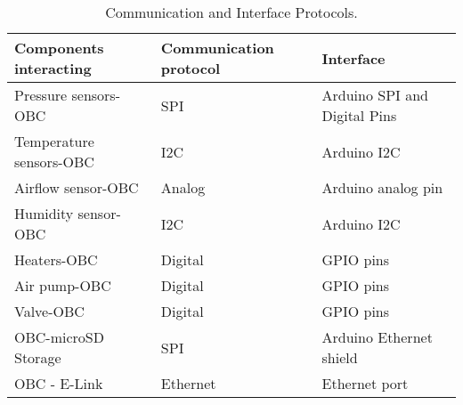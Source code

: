 \begin{table}[H]
\centering
\begin{tabular}{lll}
\textbf{Components interacting} & \textbf{Communication protocol} & \textbf{Interface}                 \\ \hline
Pressure sensors-OBC   & SPI                    & Arduino SPI and Digital Pins \\
Temperature sensors-OBC        & I2C                    & Arduino I2C \\
Airflow sensor-OBC     & Analog                    & Arduino analog pin \\
Humidity sensor-OBC            & I2C                & Arduino I2C \\
Heaters-OBC            & Digital                & GPIO pins \\
Air pump-OBC           & Digital                & GPIO pins \\
Valve-OBC              & Digital                & GPIO pins                 \\
OBC-microSD Storage    & SPI                    & Arduino Ethernet shield   \\
OBC - E-Link           & Ethernet               & Ethernet port            
\end{tabular}%
\caption{Communication and Interface Protocols.}
\label{tab:comIntpro}
\end{table}